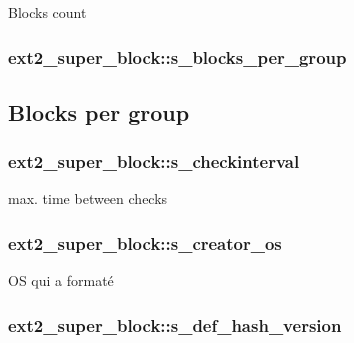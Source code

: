 Blocks count \hypertarget{structext2__super__block_a037ab0266050cd0d0026c5da1fda3ab1}{
\subsubsection[{s\-\_\-blocks\-\_\-per\-\_\-group}]{ ext2\-\_\-super\-\_\-block\-::s\-\_\-blocks\-\_\-per\-\_\-group}}\label{structext2__super__block_a037ab0266050cd0d0026c5da1fda3ab1}
\subsection*{Blocks per group}\hypertarget{structext2__super__block_a41729c3eb872813abe1489de88e6f736}{
\subsubsection[{s\-\_\-checkinterval}]{ ext2\-\_\-super\-\_\-block\-::s\-\_\-checkinterval}}\label{structext2__super__block_a41729c3eb872813abe1489de88e6f736}
max. time between checks \hypertarget{structext2__super__block_a421f09691aa0911da60db7ef23dc30ca}{
\subsubsection[{s\-\_\-creator\-\_\-os}]{ ext2\-\_\-super\-\_\-block\-::s\-\_\-creator\-\_\-os}}\label{structext2__super__block_a421f09691aa0911da60db7ef23dc30ca}
O\-S qui a formaté \hypertarget{structext2__super__block_a3120768bf3ac685a2e5d38d84ec3c5b8}{
\subsubsection[{s\-\_\-def\-\_\-hash\-\_\-version}]{ ext2\-\_\-super\-\_\-block\-::s\-\_\-def\-\_\-hash\-\_\-version}}\label{structext2__super__block_a3120768bf3ac685a2e5d38d84ec3c5b8}
